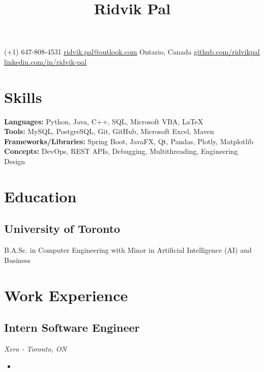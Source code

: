 \documentclass[10pt, a4paper]{article}
\begin{document}
\title{\vspace{-1.5cm}\textbf{Ridvik Pal}\vspace{-1.5cm}}
\date{}
\maketitle
\begin{center}
    (+1) 647-808-4531
    \hfill
    \href{mailto:ridvik.pal@outlook.com}{\underline{ridvik.pal@outlook.com}}
    \hfill
    Ontario, Canada
    \hfill
    \href{https://github.com/ridvikpal}{\underline{github.com/ridvikpal}}
    \hfill
    \href{https://www.linkedin.com/in/ridvik-pal}{\underline{linkedin.com/in/ridvik-pal}}
\end{center}

\section*{Skills}
\textbf{Languages:} Python, Java, C++, SQL, Microsoft VBA, \LaTeX \\
\textbf{Tools:} MySQL, PostgreSQL, Git, GitHub, Microsoft Excel, Maven \\
\textbf{Frameworks/Libraries:} Spring Boot, JavaFX, Qt, Pandas, Plotly, Matplotlib \\
\textbf{Concepts:} DevOps, REST APIs, Debugging, Multithreading, Engineering Design

\section*{Education}
\subsection*{University of Toronto \hfill {}}
B.A.Sc. in Computer Engineering with Minor in Artificial Intelligence (AI) and Business

\section*{Work Experience}
\subsection*{Intern Software Engineer \hfill {}}
\textit{Xero - Toronto, ON}
\begin{itemize}
    \item 
\end{itemize}
\end{document}
